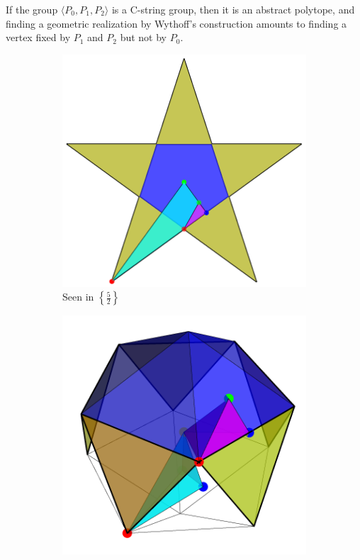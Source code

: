 \documentclass{article}
\theoremstyle{definition}
\begin{document}
	If the group $\langle P_0,P_1,P_2\rangle$ is a C-string group, then it is an abstract polytope, and finding a geometric realization by Wythoff's construction amounts to finding a vertex fixed by $P_1$ and $P_2$ but not by $P_0$.
	\begin{figure}[H]
		\begin{center}
			\begin{subfigure}{0.4\linewidth}
				\centering
				\includegraphics[width=\linewidth]{fig3a}
				\caption{Seen in $\left\{\frac{5}{2}\right\}$}\label{fig:3a}
			\end{subfigure}
			\begin{subfigure}{0.4\linewidth}
				\centering
				\includegraphics[width=\linewidth]{fig3b}

\end{subfigure}
\end{center}
\end{figure}
\end{document}
